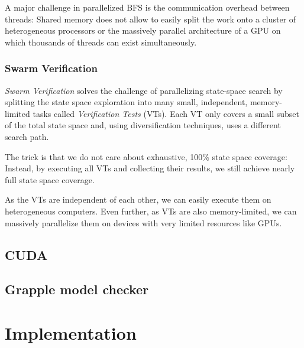 \documentclass[
fancyheadings, %
%
%
]{stsreprt}
\begin{document}
A major challenge in parallelized BFS is the communication overhead between threads:
Shared memory does not allow to easily split the work onto a cluster of heterogeneous processors or the massively parallel architecture of a GPU on which thousands of threads can exist simultaneously.

\subsection{Swarm Verification}

\emph{Swarm Verification} solves the challenge of parallelizing state-space search by splitting the state space exploration into many small, independent, memory-limited tasks called \emph{Verification Tests} (VTs).
Each VT only covers a small subset of the total state space and, using diversification techniques, uses a different search path.

The trick is that we do not care about exhaustive, 100\% state space coverage:
Instead, by executing all VTs and collecting their results, we still achieve nearly full state space coverage.

As the VTs are independent of each other, we can easily execute them on heterogeneous computers.
Even further, as VTs are also memory-limited, we can massively parallelize them on devices with very limited resources like GPUs.
\cite{Holzmann2008.Swarm-Verification}

\section{CUDA}


\section{Grapple model checker}


\chapter{Implementation}
\end{document}
